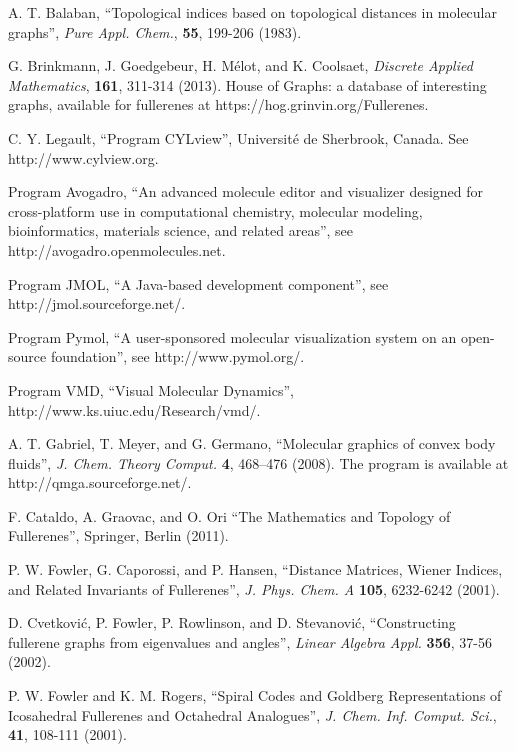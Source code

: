 \documentclass[article,a4paper,twoside]{memoir}
\begin{document}
\begin{thebibliography}{99}
 A. T. Balaban, ``Topological indices based on topological distances in molecular graphs'', \textit{Pure Appl. Chem.}, \textbf{55}, 199-206 (1983).

 G. Brinkmann,  J. Goedgebeur, H. M\'elot, and K. Coolsaet, \textit{Discrete Applied Mathematics}, \textbf{161}, 311-314 (2013). 
House of Graphs: a database of interesting graphs, available for fullerenes at https://hog.grinvin.org/Fullerenes.

 C. Y. Legault, ``Program CYLview'', Universit\'e de Sherbrook, Canada. See http://www.cylview.org.

 Program Avogadro, ``An advanced molecule editor and visualizer designed for cross-platform use in computational chemistry, molecular modeling, bioinformatics, materials science, and related areas'', see http://avogadro.openmolecules.net.

 Program JMOL, ``A Java-based development component'', see http://jmol.sourceforge.net/.

 Program Pymol, ``A user-sponsored molecular visualization system on an open-source foundation'', see http://www.pymol.org/.

 Program VMD, ``Visual Molecular Dynamics'', http://www.ks.uiuc.edu/Research/vmd/.

 A. T. Gabriel, T. Meyer, and G. Germano, 
``Molecular graphics of convex body fluids'', \textit{J. Chem. Theory Comput.}
\textbf{4}, 468--476 (2008). The program is available at http://qmga.sourceforge.net/.

 F. Cataldo, A. Graovac, and O. Ori ``The Mathematics and Topology of Fullerenes'', Springer, Berlin (2011).

 P. W. Fowler, G. Caporossi, and P. Hansen, ``Distance Matrices, Wiener Indices, and Related Invariants of Fullerenes'', 
\textit{J. Phys. Chem. A} \textbf{105}, 6232-6242 (2001).

 D. Cvetkovi\'c, P. Fowler, P. Rowlinson, and D. Stevanovi\'c, ``Constructing fullerene graphs from eigenvalues and angles'',
\textit{Linear Algebra Appl.} \textbf{356}, 37-56 (2002).

 P. W. Fowler and K. M. Rogers, ``Spiral Codes and Goldberg Representations of Icosahedral Fullerenes and Octahedral
Analogues'', \textit{J. Chem. Inf. Comput. Sci.}, \textbf{41}, 108-111 (2001).


\end{thebibliography}
\end{document}
